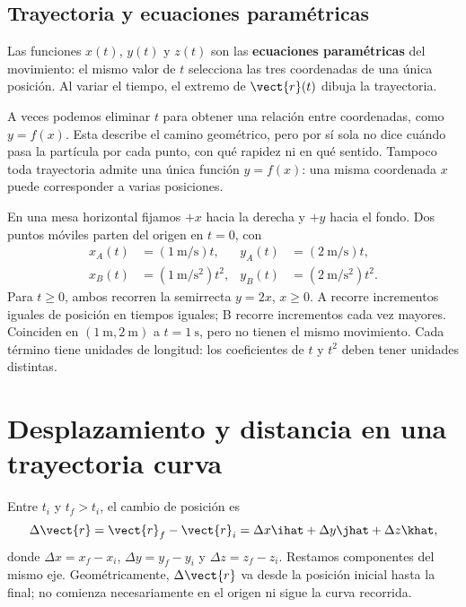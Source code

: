 \subsection{Trayectoria y ecuaciones paramétricas}

Las funciones \(x(t)\), \(y(t)\) y \(z(t)\) son las \textbf{ecuaciones
paramétricas} del movimiento: el mismo valor de \(t\) selecciona las tres
coordenadas de una única posición. Al variar el tiempo, el extremo de
\(\vect{r}(t)\) dibuja la trayectoria.

A veces podemos eliminar \(t\) para obtener una relación entre coordenadas,
como \(y=f(x)\). Esta describe el camino geométrico, pero por sí sola no
dice cuándo pasa la partícula por cada punto, con qué rapidez ni en qué
sentido. Tampoco toda trayectoria admite una única función \(y=f(x)\):
una misma coordenada \(x\) puede corresponder a varias posiciones.

\begin{ejemplo}
En una mesa horizontal fijamos \(+x\) hacia la derecha y \(+y\) hacia el
fondo. Dos puntos móviles parten del origen en \(t=0\), con
\[
\begin{aligned}
 x_A(t)&=(\SI{1}{\meter\per\second})t,
 &y_A(t)&=(\SI{2}{\meter\per\second})t,\\
 x_B(t)&=(\SI{1}{\meter\per\second\squared})t^2,
 &y_B(t)&=(\SI{2}{\meter\per\second\squared})t^2.
\end{aligned}
\]
Para \(t\geq0\), ambos recorren la semirrecta \(y=2x\), \(x\geq0\).
A recorre incrementos iguales de posición en tiempos iguales; B recorre
incrementos cada vez mayores. Coinciden en
\((\SI{1}{\meter},\SI{2}{\meter})\) a \(t=\SI{1}{\second}\), pero no
tienen el mismo movimiento. Cada término tiene unidades de longitud:
los coeficientes de \(t\) y \(t^2\) deben tener unidades distintas.
\end{ejemplo}

\section{Desplazamiento y distancia en una trayectoria curva}

Entre \(t_i\) y \(t_f>t_i\), el cambio de posición es
\[ \Delta\vect{r}=\vect{r}_f-\vect{r}_i
=\Delta x\ihat+\Delta y\jhat+\Delta z\khat, \]
donde \(\Delta x=x_f-x_i\), \(\Delta y=y_f-y_i\) y
\(\Delta z=z_f-z_i\). Restamos componentes del mismo eje.
Geométricamente, \(\Delta\vect{r}\) va desde la posición inicial hasta la
final; no comienza necesariamente en el origen ni sigue la curva recorrida.

